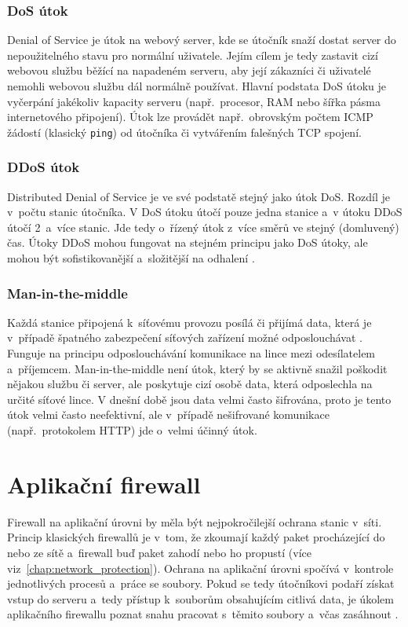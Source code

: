 \subsection*{DoS útok}
\label{sec:DoS_force}
Denial of Service je útok na webový server, kde se útočník snaží dostat server do nepoužitelného stavu pro normální uživatele. Jejím cílem je tedy zastavit cizí webovou službu běžící na napadeném serveru, aby její zákazníci či uživatelé nemohli webovou službu dál normálně používat. Hlavní podstata DoS útoku je vyčerpání jakékoliv kapacity serveru (např.~procesor, RAM nebo šířka pásma internetového připojení). Útok lze provádět např.~obrovským počtem ICMP žádostí (klasický \texttt{ping}) od útočníka či vytvářením falešných TCP spojení.

\subsection*{DDoS útok}
\label{sec:DDoS_force}
Distributed Denial of Service je ve své podstatě stejný jako útok DoS. Rozdíl je v~počtu stanic útočníka. V DoS útoku útočí pouze jedna stanice a~v útoku DDoS útočí 2~a~více stanic. Jde tedy o~řízený útok z~více směrů ve stejný (domluvený) čas. Útoky DDoS mohou fungovat na stejném principu jako DoS útoky, ale mohou být sofistikovanější a~složitější na odhalení \cite{bib:ddos}. 

\subsection*{Man-in-the-middle}
Každá stanice připojená k~síťovému provozu posílá či přijímá data, která je v~případě špatného zabezpečení síťových zařízení možné odposlouchávat \cite{bib:kyber_utoky}. Funguje na principu odposlouchávání komunikace na lince mezi odesílatelem a~příjemcem. Man-in-the-middle není útok, který by se aktivně snažil poškodit nějakou službu či server, ale poskytuje cizí osobě data, která odposlechla na určité síťové lince. V dnešní době jsou data velmi často šifrována, proto je tento útok velmi často neefektivní, ale v~případě nešifrované komunikace (např.~protokolem HTTP) jde o~velmi účinný útok.

\chapter{Aplikační firewall}
\label{chap:application_firewall}
Firewall na aplikační úrovni by měla být nejpokročilejší ochrana stanic v~síti. Princip klasických firewallů je v~tom, že zkoumají každý paket procházející do nebo ze sítě a~firewall buď paket zahodí nebo ho propustí (více viz~\ref{chap:network_protection}). Ochrana na aplikační úrovni spočívá v~kontrole jednotlivých procesů a~práce se soubory. Pokud se tedy útočníkovi podaří získat vstup do serveru a~tedy přístup k~souborům obsahujícím citlivá data, je úkolem aplikačního firewallu poznat snahu pracovat s~těmito soubory a~včas zasáhnout \cite{bib:aplikacni_fw}.

